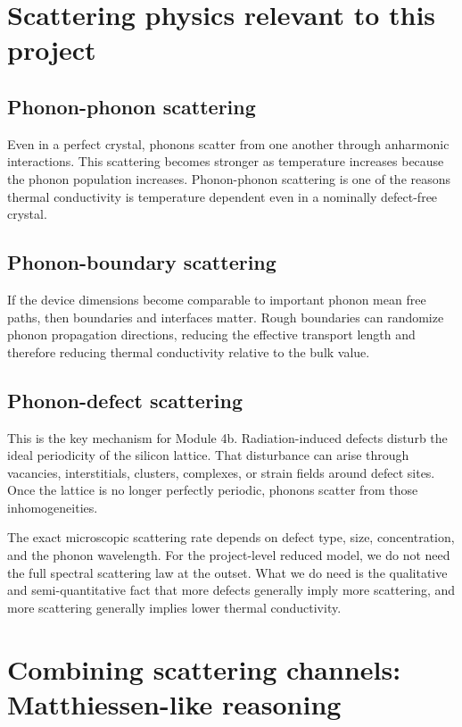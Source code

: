 \documentclass[11pt]{article}
\begin{document}
\section{Scattering physics relevant to this project}

\subsection{Phonon-phonon scattering}

Even in a perfect crystal, phonons scatter from one another through anharmonic interactions. This scattering becomes stronger as temperature increases because the phonon population increases. Phonon-phonon scattering is one of the reasons thermal conductivity is temperature dependent even in a nominally defect-free crystal.

\subsection{Phonon-boundary scattering}

If the device dimensions become comparable to important phonon mean free paths, then boundaries and interfaces matter. Rough boundaries can randomize phonon propagation directions, reducing the effective transport length and therefore reducing thermal conductivity relative to the bulk value.

\subsection{Phonon-defect scattering}

This is the key mechanism for Module 4b. Radiation-induced defects disturb the ideal periodicity of the silicon lattice. That disturbance can arise through vacancies, interstitials, clusters, complexes, or strain fields around defect sites. Once the lattice is no longer perfectly periodic, phonons scatter from those inhomogeneities.

The exact microscopic scattering rate depends on defect type, size, concentration, and the phonon wavelength. For the project-level reduced model, we do not need the full spectral scattering law at the outset. What we do need is the qualitative and semi-quantitative fact that more defects generally imply more scattering, and more scattering generally implies lower thermal conductivity.

\section{Combining scattering channels: Matthiessen-like reasoning}
\end{document}

